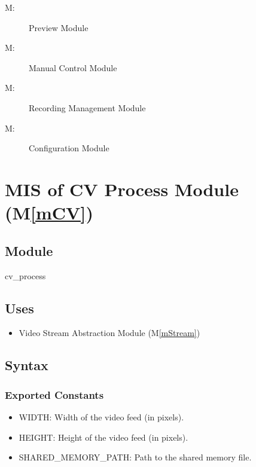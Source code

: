 \documentclass[12pt, titlepage]{article}
\newcounter{mnum}
\newcommand{\mthemnum}{M\themnum}
\newcommand{\mref}[1]{M\ref{#1}}
\begin{document}
\begin{description}
        \begin{description}
          \item [ \mthemnum \label{mPreview}:] Preview Module
          \item [ \mthemnum \label{mManual}:] Manual Control Module
          \item [ \mthemnum \label{mRecordMng}:] Recording Management Module
          \item [ \mthemnum \label{mConfig}:] Configuration Module
        \end{description}
\end{description}

\newpage

\section{MIS of CV Process Module (\mref{mCV})}

\subsection{Module}

cv\_process

\subsection{Uses}

\begin{itemize}
  \item Video Stream Abstraction Module (\mref{mStream})
\end{itemize}

\subsection{Syntax}

\subsubsection{Exported Constants}

\begin{itemize}
  \item WIDTH: Width of the video feed (in pixels).
  \item HEIGHT: Height of the video feed (in pixels).
  \item SHARED\_MEMORY\_PATH: Path to the shared memory file.
\end{itemize}
\end{document}
